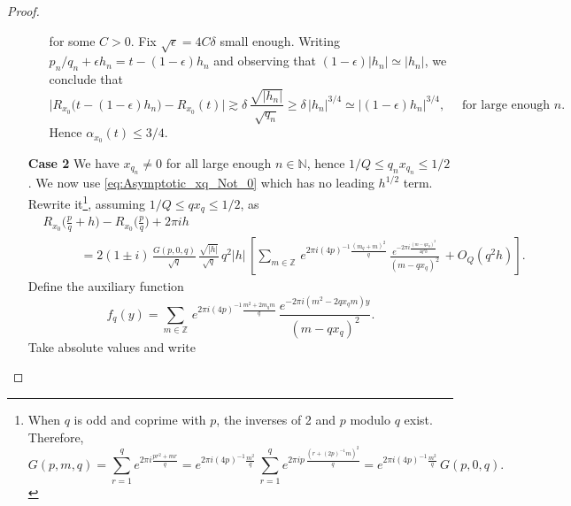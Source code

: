 \documentclass[10pt,a4paper]{amsart}
\begin{document}
\begin{proof}
\begin{itemize}
\begin{itemize}
\begin{equation}
\end{equation}
for some $C>0$.
Fix $\sqrt{\epsilon} = 4C \delta$ small enough.
Writing $p_n/q_n + \epsilon h_n = t - (1-\epsilon) h_n$ and observing that $(1-\epsilon)|h_n| \simeq |h_n|$, we conclude that 
\begin{equation}
 \Big| R_{x_0} \big( t - (1- \epsilon) h_n \big)  - R_{x_0}( t ) \Big| 
 \gtrsim \delta \,  \frac{\sqrt{|h_n|}}{\sqrt{q_n}}
 \geq \delta \, |h_n|^{3/4} 
 \simeq | (1-\epsilon) h_n |^{3/4}, 
 \quad \text{ for large enough } n. 
\end{equation}
Hence $\alpha_{x_0}(t) \leq 3/4$. 
 
\end{itemize}
	
	
	\item[\textbf{Case 2}] We have $x_{q_n} \neq 0$ for all large enough $n \in \mathbb N$,
	hence $1/Q \leq q_n x_{q_n} \leq 1/2$. 
	We now use \eqref{eq:Asymptotic_xq_Not_0} which
	has no leading $h^{1/2}$ term. 
	Rewrite it\footnote{
	When $q$ is odd and coprime with $p$, the inverses of 2 and $p$ modulo $q$ exist.
	Therefore, 
	\begin{equation}
	G(p,m,q) = \sum_{r=1}^q e^{2\pi i \frac{pr^2 + mr}{q}}
	= e^{2\pi i (4p)^{-1}\frac{m^2}{q}} \, \sum_{r=1}^q e^{2\pi i p \, \frac{(r + (2p)^{-1}m)^2}{q} } 
	= e^{2\pi i (4p)^{-1}\frac{m^2}{q}} \, G(p,0,q).
	\end{equation}	
	}, %
	assuming $1/Q \leq qx_q \leq 1/2$, 
	as	
	\begin{equation}
	\begin{split}
& R_{x_0}\Big( \frac{p}{q} + h \Big) - R_{x_0}\Big( \frac{p}{q} \Big) + 2\pi i h  \\
& \qquad \quad = 2(1 \pm i) \, \frac{G(p,0,q)}{\sqrt{q}}\, \frac{\sqrt{|h|}}{\sqrt{q}} \,  q^{2} |h| \, \left[  \sum_{m \in \mathbb Z} \, e^{2\pi i (4p)^{-1} \frac{(m_q + m)^2}{q}} \,  
\frac{e^{- 2\pi i \frac{(m - qx_q)^2}{4 q^2 h}}}{ (m - qx_q)^2} \,  + O_Q\left( q^{2} h  \right)
\right].
\end{split}
	\end{equation}
	Define the auxiliary function
	\begin{equation}\label{eq:f_q}
	f_q(y) = \sum_{m \in \mathbb Z} \, e^{2\pi i (4p)^{-1} \frac{ m^2 + 2m_q m}{q}} \,  
\frac{e^{- 2\pi i (m^2  - 2 qx_q m)  y }}{ (m - qx_q)^2}.
	\end{equation}
	Take absolute values and write

\end{itemize}
\end{proof}
\end{document}
